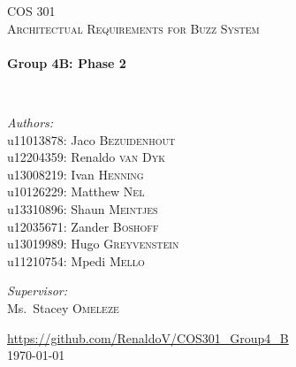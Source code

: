 
\begin{titlepage}
\begin{center}


\textsc{\LARGE COS 301}\\[1.5cm]

\textsc{\large Architectual Requirements for Buzz System}\\[0.5cm]

\HRule \\[0.4cm]
{ \huge \bfseries Group 4B: Phase 2 \\[0.4cm] }

\HRule \\[1.5cm]

\noindent
\begin{minipage}{0.4\textwidth}
\begin{flushleft} \large
\emph{Authors:}\\
u11013878: Jaco \textsc{Bezuidenhout}\\
u12204359: Renaldo \textsc{van Dyk}\\
u13008219: Ivan \textsc{Henning}\\
u10126229: Matthew \textsc{Nel}\\
u13310896: Shaun \textsc{Meintjes}\\
u12035671: Zander \textsc{Boshoff}\\
u13019989: Hugo \textsc{Greyvenstein}\\
u11210754: Mpedi \textsc{Mello}\\

\end{flushleft}
\end{minipage}
\begin{minipage}{0.4\textwidth}
\begin{flushright} \large
\emph{Supervisor:} \\
Ms.~Stacey \textsc{Omeleze}
\end{flushright}
\end{minipage}





\vfill

\url{ https://github.com/RenaldoV/COS301_Group4_B}\\
{\large \today}

\end{center}
\end{titlepage}
